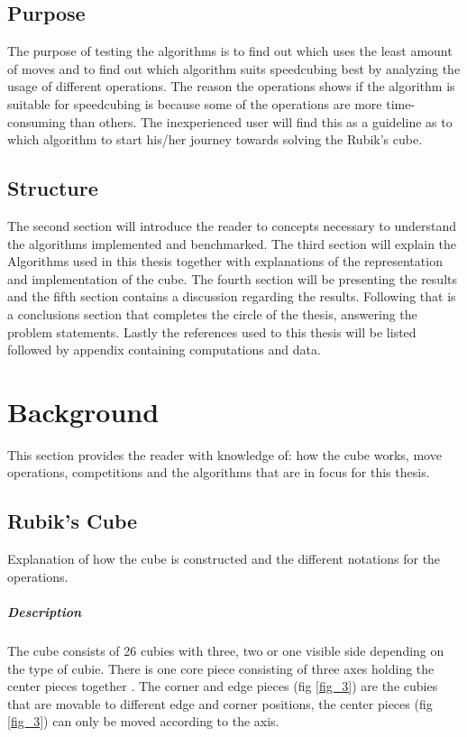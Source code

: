 \documentclass[a4paper,11pt]{kth-mag}
\begin{document}
\section{Purpose}
The purpose of testing the algorithms is to find out which uses the least amount of moves and to find out which algorithm suits speedcubing best by analyzing the usage of different operations. The reason the operations shows if the algorithm is suitable for speedcubing is because some of the operations are more time-consuming than others. The inexperienced user will find this as a guideline as to which algorithm to start his/her journey towards solving the Rubik’s cube.
\section{Structure}
The second section will introduce the reader to concepts necessary to understand the algorithms implemented and benchmarked. The third section will explain the Algorithms used in this thesis together with explanations of the representation and implementation of the cube. The fourth section will be presenting the results and the fifth section contains a discussion regarding the results. Following that is a conclusions section that completes the circle of the thesis, answering the problem statements. Lastly the references used to this thesis will be listed followed by appendix containing computations and data.  


\chapter{Background}
This section provides the reader with knowledge of: how the cube works, move operations, competitions and the algorithms that are in focus for this thesis.
\section{Rubik's Cube}
Explanation of how the cube is constructed and the different notations for the operations.
\paragraph{Description}
The cube consists of 26 cubies with three, two or one visible side depending on the type of cubie. There is one core piece consisting of three axes holding the center pieces together \cite{MadeHow}. 
  The corner and edge pieces (fig \ref{fig_3})  are the cubies that are movable to different edge and corner positions, the center pieces (fig \ref{fig_3}) can only be moved according to the axis.  
\end{document}
